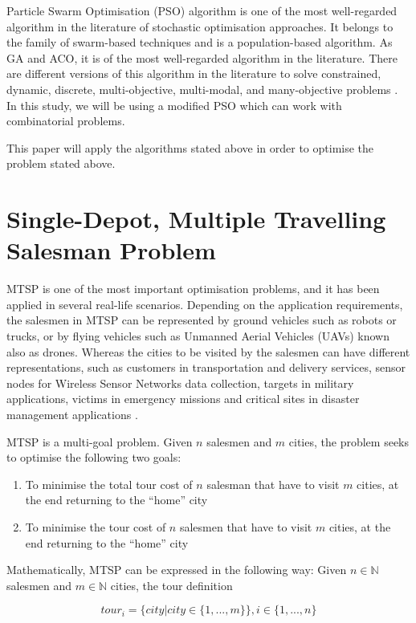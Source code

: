 \documentclass[conference]{IEEEtran}
\begin{document}
Particle Swarm Optimisation (PSO) algorithm is one of the most well-regarded algorithm in the literature of stochastic optimisation
approaches. It belongs to the family of swarm-based techniques and is a population-based algorithm. As GA and ACO, it is
of the most well-regarded algorithm in the literature. There are different versions of this algorithm in the literature
to solve constrained, dynamic, discrete, multi-objective, multi-modal, and many-objective problems \cite{b3}. In this study,
we will be using a modified PSO which can work with combinatorial problems.

This paper will apply the algorithms stated above in order to optimise the problem stated above.

\section{Single-Depot, Multiple Travelling Salesman Problem}
MTSP is one of the most important optimisation problems, and it has been applied in several real-life scenarios. Depending
on the application requirements, the salesmen in MTSP can be represented by ground vehicles such as robots or trucks, or by
flying vehicles such as Unmanned Aerial Vehicles (UAVs) known also as drones. Whereas the cities to be visited by the salesmen
can have different representations, such as customers in transportation and delivery services, sensor nodes for Wireless Sensor
Networks data collection, targets in military applications, victims in emergency missions and critical sites in disaster management
applications \cite{b1}.

MTSP is a multi-goal problem. Given $n$ salesmen and $m$ cities, the problem seeks to optimise the following two goals:
\begin{enumerate}
    \item To minimise the total tour cost of $n$ salesman that have to visit $m$ cities, at the end returning to the ``home'' city
    \item To minimise the tour cost of $n$ salesmen that have to visit $m$ cities, at the end returning to the ``home'' city
\end{enumerate}

Mathematically, MTSP can be expressed in the following way: Given $n \in \mathbb{N}$ salesmen and $m \in \mathbb{N}$ cities,
the tour definition

\begin{equation}
    tour_i = \{city | city \in \{1, ..., m\}\}, i \in \{1, ..., n\}
\end{equation}
\end{document}
